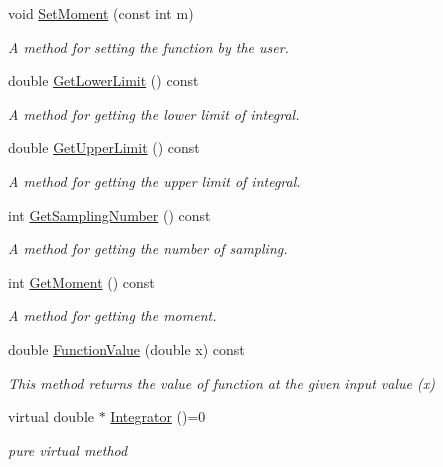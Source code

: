 \begin{DoxyCompactItemize}
void \hyperlink{class_abstract_integrator_a871fa27363ee09b98c964ccaa33da100}{Set\+Moment} (const int m)
\begin{DoxyCompactList}\small\item\em A method for setting the function by the user. \end{DoxyCompactList}\item 
double \hyperlink{class_abstract_integrator_ae27a09d1e3fb0a30ce9545a4d8f29cad}{Get\+Lower\+Limit} () const
\begin{DoxyCompactList}\small\item\em A method for getting the lower limit of integral. \end{DoxyCompactList}\item 
double \hyperlink{class_abstract_integrator_a864fe7dc9aa1ff0b36da0b8f361a5b69}{Get\+Upper\+Limit} () const
\begin{DoxyCompactList}\small\item\em A method for getting the upper limit of integral. \end{DoxyCompactList}\item 
int \hyperlink{class_abstract_integrator_ac58629ec6822b3beeefdd1323b627704}{Get\+Sampling\+Number} () const
\begin{DoxyCompactList}\small\item\em A method for getting the number of sampling. \end{DoxyCompactList}\item 
int \hyperlink{class_abstract_integrator_a7f709ab302dfe70b5f0f2ce80456fcdb}{Get\+Moment} () const
\begin{DoxyCompactList}\small\item\em A method for getting the moment. \end{DoxyCompactList}\item 
double \hyperlink{class_abstract_integrator_a6262731b81f3ad7e984ba354b4601356}{Function\+Value} (double x) const
\begin{DoxyCompactList}\small\item\em This method returns the value of function at the given input value (x) \end{DoxyCompactList}\item 
virtual double $\ast$ \hyperlink{class_abstract_integrator_a073d8f87239f732b3d2832070caa3b17}{Integrator} ()=0
\begin{DoxyCompactList}\small\item\em pure virtual method \end{DoxyCompactList}\end{DoxyCompactItemize}



